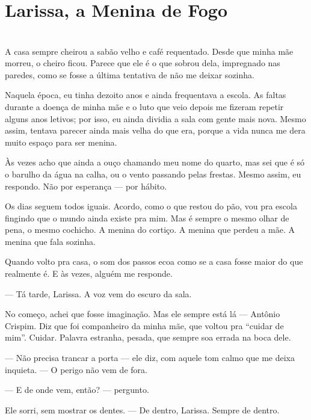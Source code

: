 \newpage

\ifdefined\useChapters
\chapter{Larissa, a Menina de Fogo}
\else
\chapter{}
\fi

A casa sempre cheirou a sabão velho e café requentado.  
Desde que minha mãe morreu, o cheiro ficou.  
Parece que ele é o que sobrou dela, impregnado nas paredes, como se fosse a última tentativa de não me deixar sozinha.  

Naquela época, eu tinha dezoito anos e ainda frequentava a escola. As faltas durante a doença de minha mãe e o luto que veio depois me fizeram repetir alguns anos letivos; por isso, eu ainda dividia a sala com gente mais nova. Mesmo assim, tentava parecer ainda mais velha do que era, porque a vida nunca me dera muito espaço para ser menina.

Às vezes acho que ainda a ouço chamando meu nome do quarto, mas sei que é só o barulho da água na calha, ou o vento passando pelas frestas.  
Mesmo assim, eu respondo.  
Não por esperança — por hábito.

Os dias seguem todos iguais.  
Acordo, como o que restou do pão, vou pra escola fingindo que o mundo ainda existe pra mim.  
Mas é sempre o mesmo olhar de pena, o mesmo cochicho.  
A menina do cortiço.  
A menina que perdeu a mãe.  
A menina que fala sozinha.

Quando volto pra casa, o som dos passos ecoa como se a casa fosse maior do que realmente é.  
E às vezes, alguém me responde.

— Tá tarde, Larissa.  
A voz vem do escuro da sala.

No começo, achei que fosse imaginação.  
Mas ele sempre está lá — Antônio Crispim.  
Diz que foi companheiro da minha mãe, que voltou pra “cuidar de mim”.  
Cuidar.  
Palavra estranha, pesada, que sempre soa errada na boca dele.

— Não precisa trancar a porta — ele diz, com aquele tom calmo que me deixa inquieta. — O perigo não vem de fora.

— E de onde vem, então? — pergunto.

Ele sorri, sem mostrar os dentes.  
— De dentro, Larissa. Sempre de dentro.

\medskip

